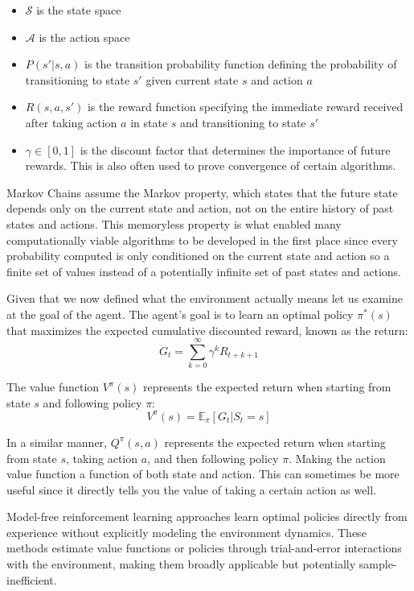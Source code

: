 \documentclass[
	english,
	ruledheaders=section,
	class=report,
	thesis={type=master},
	accentcolor=9c,
	custommargins=true,
	marginpar=false,
	parskip=half-,
	fontsize=11pt,
]{tudapub}
\begin{document}
\begin{itemize}
	\item $\mathcal{S}$ is the state space
	\item $\mathcal{A}$ is the action space
	\item $P(s'|s,a)$ is the transition probability function defining the probability of transitioning to state $s'$ given current state $s$ and action $a$
	\item $R(s,a,s')$ is the reward function specifying the immediate reward received after taking action $a$ in state $s$ and transitioning to state $s'$
	\item $\gamma \in [0,1]$ is the discount factor that determines the importance of future rewards. This is also often used to prove convergence of certain algorithms.
\end{itemize}

Markov Chains assume the Markov property, which states that the future state
depends only on the current state and action, not on the entire history of past
states and actions. This memoryless property is what enabled many
computationally viable algorithms to be developed in the first place since
every probability computed is only conditioned on the current state and action
so a finite set of values instead of a potentially infinite set of past states
and actions.

Given that we now defined what the environment actually means let us examine at
the goal of the agent. The agent's goal is to learn an optimal policy
$\pi^*(s)$ that maximizes the expected cumulative discounted reward, known as
the return:
\begin{equation}
	G_t = \sum_{k=0}^{\infty} \gamma^k R_{t+k+1}
\end{equation}

The value function $V^\pi(s)$ represents the expected return when starting from
state $s$ and following policy $\pi$:
\begin{equation}
	V^\pi(s) = \mathbb{E}_\pi[G_t | S_t = s]
\end{equation}

In a similar manner, $Q^\pi(s,a)$ represents the expected return when starting
from state $s$, taking action $a$, and then following policy $\pi$. Making the
action value function a function of both state and action. This can sometimes
be more useful since it directly tells you the value of taking a certain action
as well.

Model-free reinforcement learning approaches learn optimal policies directly
from experience without explicitly modeling the environment dynamics. These
methods estimate value functions or policies through trial-and-error
interactions with the environment, making them broadly applicable but
potentially sample-inefficient.
\end{document}
